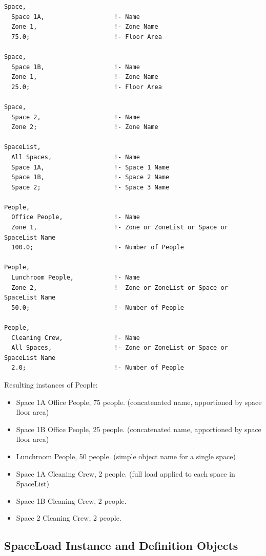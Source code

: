 \begin{lstlisting}
Space,
  Space 1A,                   !- Name
  Zone 1,                     !- Zone Name
  75.0;                       !- Floor Area

Space,
  Space 1B,                   !- Name
  Zone 1,                     !- Zone Name
  25.0;                       !- Floor Area

Space,
  Space 2,                    !- Name
  Zone 2;                     !- Zone Name

SpaceList,
  All Spaces,                 !- Name
  Space 1A,                   !- Space 1 Name
  Space 1B,                   !- Space 2 Name
  Space 2;                    !- Space 3 Name

People,
  Office People,              !- Name
  Zone 1,                     !- Zone or ZoneList or Space or SpaceList Name
  100.0;                      !- Number of People

People,
  Lunchroom People,           !- Name
  Zone 2,                     !- Zone or ZoneList or Space or SpaceList Name
  50.0;                       !- Number of People

People,
  Cleaning Crew,              !- Name
  All Spaces,                 !- Zone or ZoneList or Space or SpaceList Name
  2.0;                        !- Number of People
\end{lstlisting}

Resulting instances of People:

\begin{itemize}
  \item  Space 1A Office People, 75 people. (concatenated name, apportioned by space floor area)
  \item  Space 1B Office People, 25 people. (concatenated name, apportioned by space floor area)
  \item  Lunchroom People, 50 people.       (simple object name for a single space)
  \item  Space 1A Cleaning Crew, 2 people.  (full load applied to each space in SpaceList)
  \item  Space 1B Cleaning Crew, 2 people.
  \item  Space 2 Cleaning Crew, 2 people.
\end{itemize}



\subsection{SpaceLoad Instance and Definition Objects}\label{internal-gains-instance-and-definition-objects}

